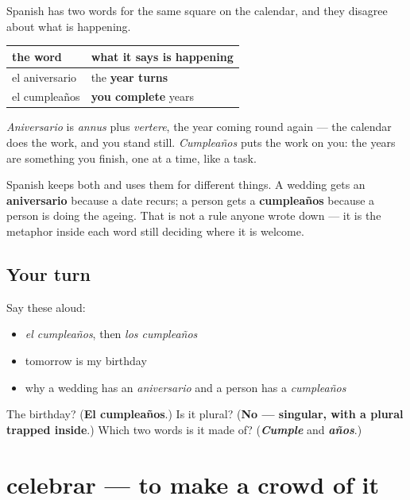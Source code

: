 \begin{culture}
Spanish has two words for the same square on the calendar, and they disagree about what is happening.

\noindent
\begin{tabularx}{\linewidth}{@{}>{\raggedright\arraybackslash}X>{\raggedright\arraybackslash}X@{}}
\toprule
\textbf{the word} & \textbf{what it says is happening} \\
\midrule
el aniversario & the \textbf{year turns} \\
el cumpleaños & \textbf{you complete} years \\
\bottomrule
\end{tabularx}

\emph{Aniversario} is \emph{annus} plus \emph{vertere}, the year coming round again — the calendar does the work, and you stand still. \emph{Cumpleaños} puts the work on you: the years are something you finish, one at a time, like a task.

Spanish keeps both and uses them for different things. A wedding gets an \textbf{aniversario} because a date recurs; a person gets a \textbf{cumpleaños} because a person is doing the ageing. That is not a rule anyone wrote down — it is the metaphor inside each word still deciding where it is welcome.
\end{culture}

\subsection*{Your turn}
Say these aloud:

\begin{itemize}
\raggedright
  \item \emph{el cumpleaños}, then \emph{los cumpleaños}
  \item tomorrow is my birthday
  \item why a wedding has an \emph{aniversario} and a person has a \emph{cumpleaños}
\end{itemize}

\begin{tcolorbox}[breakable,colback=teal!4,colframe=teal!35!black,title={Before you move on}]
The birthday? (\textbf{El cumpleaños}.) Is it plural? (\textbf{No — singular, with a plural trapped inside}.) Which two words is it made of? (\emph{\textbf{Cumple}} and \emph{\textbf{años}}.)
\end{tcolorbox}
\section[celebrar]{celebrar — to make a crowd of it}

